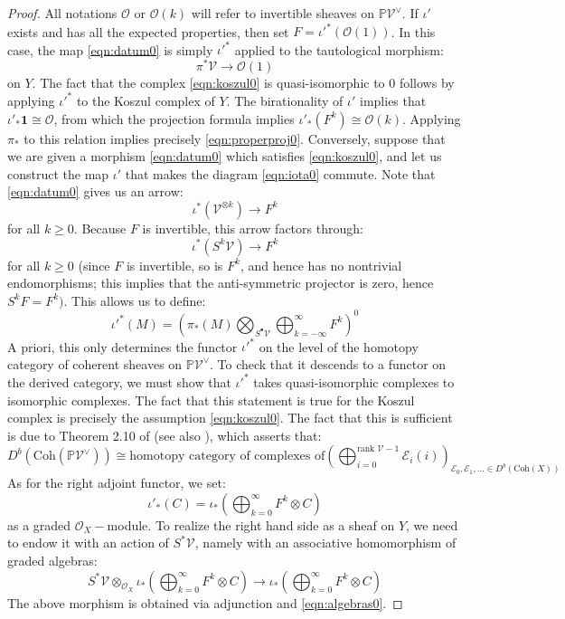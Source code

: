 \documentclass[12pt]{amsart}
\numberwithin{equation}{section}
\theoremstyle{definition}
\theoremstyle{remark}
\newcommand{\PP}{\mathbb{P}}
\newcommand{\CE}{\mathcal{E}}
\newcommand{\CO}{\mathcal{O}}
\newcommand{\CV}{\mathcal{V}}
\renewcommand{\1}{\mathbf{1}}
\newcommand{\coh}{\mathrm{Coh}}
\begin{document}
\begin{proof} All notations $\CO$ or $\CO(k)$ will refer to invertible sheaves on $\PP \CV^\vee$. If $\iota'$ exists and has all the expected properties, then set $F = {\iota'}^*(\CO(1))$. In this case, the map \eqref{eqn:datum0} is simply ${\iota'}^*$ applied to the tautological morphism:
$$
\pi^*\CV \longrightarrow \CO(1)
$$
on $Y$. The fact that the complex \eqref{eqn:koszul0} is quasi-isomorphic to 0 follows by applying ${\iota'}^*$ to the Koszul complex of $Y$. The birationality of $\iota'$ implies that $\iota'_*\1 \cong \CO$, from which the projection formula implies $\iota'_*(F^k) \cong \CO(k)$. Applying $\pi_*$ to this relation implies precisely \eqref{eqn:properproj0}. Conversely, suppose that we are given a morphism \eqref{eqn:datum0} which satisfies \eqref{eqn:koszul0}, and let us construct the map $\iota'$ that makes the diagram \eqref{eqn:iota0} commute. Note that \eqref{eqn:datum0} gives us an arrow:
$$
\iota^*\left(\CV^{\otimes k} \right) \longrightarrow F^k
$$
for all $k\geq 0$. Because $F$ is invertible, this arrow factors through:
\begin{equation}
\label{eqn:algebras0}
\iota^*\left(S^k\CV \right) \longrightarrow F^k
\end{equation}
for all $k\geq 0$ (since $F$ is invertible, so is $F^k$, and hence has no nontrivial endomorphisms; this implies that the anti-symmetric projector is zero, hence $S^kF = F^k)$. This allows us to define:
$$
{\iota'}^*(M) = \left(\pi_*(M) \bigotimes_{S^{\bullet}\CV} \bigoplus_{k=-\infty}^{\infty} F^k \right)^0
$$
A priori, this only determines the functor ${\iota'}^*$ on the level of the homotopy category of coherent sheaves on $\PP\CV^\vee$. To check that it descends to a functor on the derived category, we must show that ${\iota'}^*$ takes quasi-isomorphic complexes to isomorphic complexes. The fact that this statement is true for the Koszul complex is precisely the assumption \eqref{eqn:koszul0}. The fact that this is sufficient is due to Theorem 2.10 of \cite{DanHL} (see also \cite{BFK}), which asserts that:
$$
D^b \left(\coh(\PP \CV^\vee ) \right) \cong \text{homotopy category of complexes of} \left( \bigoplus_{i=0}^{\text{rank }\CV-1} \CE_i(i) \right)_{\CE_0,\CE_1,... \in D^b(\coh(X))} 
$$ 
As for the right adjoint functor, we set:
$$
\iota'_*(C) = \iota_* \left( \bigoplus_{k=0}^\infty F^k \otimes C \right)
$$
as a graded $\CO_X-$module. To realize the right hand side as a sheaf on $Y$, we need to endow it with an action of $S^*\CV$, namely with an associative homomorphism of graded algebras:
$$
S^*\CV \otimes_{\CO_X} \iota_* \left( \bigoplus_{k=0}^\infty F^k \otimes C \right) \longrightarrow \iota_* \left( \bigoplus_{k=0}^\infty F^k \otimes C \right)
$$
The above morphism is obtained via adjunction and \eqref{eqn:algebras0}. 
\end{proof}
\end{document}
